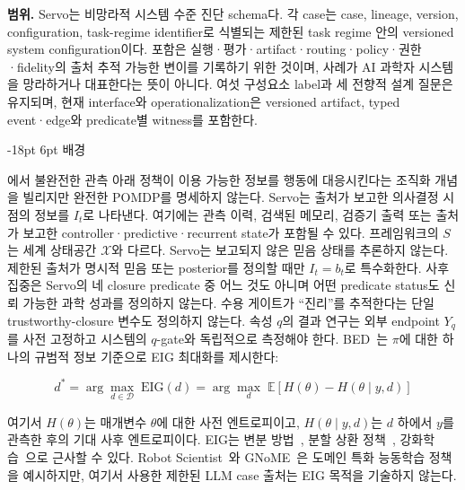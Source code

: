 \documentclass[11pt]{article}
\makeatletter
\renewcommand\section{\@startsection{section}{1}{\z@}%
  {-18pt \@plus -4pt \@minus -2pt}%
  {6pt \@plus 2pt}%
  {\normalfont\large\bfseries}}
\makeatother
\begin{document}
\noindent\textbf{범위.} Servo는 비망라적 시스템 수준 진단 schema다. 각 case는 case, lineage, version, configuration, task-regime identifier로 식별되는 제한된 task regime 안의 versioned system configuration이다. 포함은 실행·평가·artifact·routing·policy·권한·fidelity의 출처 추적 가능한 변이를 기록하기 위한 것이며, 사례가 AI 과학자 시스템을 망라하거나 대표한다는 뜻이 아니다. 여섯 구성요소 label과 세 전향적 설계 질문은 유지되며, 현재 interface와 operationalization은 versioned artifact, typed event·edge와 predicate별 witness를 포함한다.

\section{배경}
\label{sec:background}

\citet{kaelbling1998pomdp}에서 불완전한 관측 아래 정책이 이용 가능한 정보를 행동에 대응시킨다는 조직화 개념을 빌리지만 완전한 POMDP를 명세하지 않는다. Servo는 출처가 보고한 의사결정 시점의 정보를 $I_t$로 나타낸다. 여기에는 관측 이력, 검색된 메모리, 검증기 출력 또는 출처가 보고한 controller·predictive·recurrent state가 포함될 수 있다. 프레임워크의 $S$는 세계 상태공간 $\mathcal X$와 다르다. Servo는 보고되지 않은 믿음 상태를 추론하지 않는다. 제한된 출처가 명시적 믿음 또는 posterior를 정의할 때만 $I_t=b_t$로 특수화한다. 사후 집중은 Servo의 네 closure predicate 중 어느 것도 아니며 어떤 predicate status도 신뢰 가능한 과학 성과를 정의하지 않는다. 수용 게이트가 ``진리''를 추적한다는 단일 trustworthy-closure 변수도 정의하지 않는다. 속성 $q$의 결과 연구는 외부 endpoint $Y_q$를 사전 고정하고 시스템의 $q$-gate와 독립적으로 측정해야 한다. BED~\citep{chaloner1995bayesian,rainforth2024modern}는 $\pi$에 대한 하나의 규범적 정보 기준으로 EIG 최대화를 제시한다:

\begin{equation}
  d^* = \arg\max_{d \in \mathcal{D}}\; \mathrm{EIG}(d) = \arg\max_{d}\; \mathbb{E}\left[H(\theta) - H(\theta \mid y, d)\right]
  \label{eq:eid}
\end{equation}

여기서 $H(\theta)$는 매개변수 $\theta$에 대한 사전 엔트로피이고, $H(\theta \mid y, d)$는 $d$ 하에서 $y$를 관측한 후의 기대 사후 엔트로피이다. EIG는 변분 방법~\citep{foster2019variational}, 분할 상환 정책~\citep{foster2021dad}, 강화학습~\citep{blau2022rl}으로 근사할 수 있다. Robot Scientist~\citep{king2004robot}와 GNoME~\citep{merchant2023gnome}은 도메인 특화 능동학습 정책을 예시하지만, 여기서 사용한 제한된 LLM case 출처는 EIG 목적을 기술하지 않는다.
\end{document}
